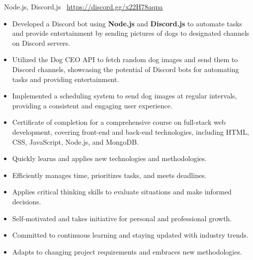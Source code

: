 \documentclass[9pt,a4paper,ragged2e,withhyper]{altacv}
\newcommand{\project}[4]{
		\cvsubsection{#1}
		\vspace{-0.25em}
		{\small \faCode\,\,\,#2}\newline
		{\small \faDesktop\,\,\,\url{#3}}
		\vspace{0.5em}
		\begin{itemize}
			#4
		\end{itemize}
	}
\begin{document}
\begin{paracol}{2}
	\divider

	\project{DoggoBot}{Node.js, Discord.js}{https://discord.gg/x22H78aqpa}{
		\item Developed a Discord bot using \textbf{Node.js} and \textbf{Discord.js} to automate tasks and provide entertainment by sending pictures of dogs to designated channels on Discord servers.
		\item Utilized the Dog CEO API to fetch random dog images and send them to Discord channels, showcasing the potential of Discord bots for automating tasks and providing entertainment.
		\item Implemented a scheduling system to send dog images at regular intervals, providing a consistent and engaging user experience.
	}

	\switchcolumn


	\begin{itemize}
		\item Certificate of completion for a comprehensive course on full-stack web development, covering front-end and back-end technologies, including HTML, CSS, JavaScript, Node.js, and MongoDB.
	\end{itemize}


	\begin{itemize}
		\item Quickly learns and applies new technologies and methodologies.
		\item Efficiently manages time, prioritizes tasks, and meets deadlines.
		\item Applies critical thinking skills to evaluate situations and make informed decisions.
		\item Self-motivated and takes initiative for personal and professional growth.
		\item Committed to continuous learning and staying updated with industry trends.
		\item Adapts to changing project requirements and embraces new methodologies.
	\end{itemize}


	\divider


\end{paracol}
\end{document}
